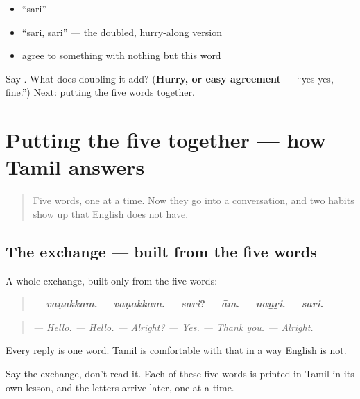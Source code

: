 \begin{itemize}
\raggedright
  \item \textquotedblleft{}sari\textquotedblright{}
  \item \textquotedblleft{}sari, sari\textquotedblright{} — the doubled, hurry-along version
  \item agree to something with nothing but this word
\end{itemize}

\begin{tcolorbox}[breakable,colback=teal!4,colframe=teal!35!black,title={Before you move on}]
Say \textbf{}. What does doubling it add? (\textbf{Hurry, or easy agreement} — \textquotedblleft{}yes yes, fine.\textquotedblright{}) Next: putting the five words together.
\end{tcolorbox}
\section[\texorpdfstring{\ta{ஆம்} / \ta{இல்லை} / \ta{சரி} (ām / illai / sari)}{ஆம் / இல்லை / சரி (ām / illai / sari)}]{Putting the five together — how Tamil answers}

\label{lesson:TA-C01-answering}



\begin{quote}
Five words, one at a time. Now they go into a conversation, and two habits show up that English does not have.
\end{quote}

\subsection*{The exchange — built from the five words}
A whole exchange, built only from the five words:

\begin{quote}
— \textbf{\emph{vaṇakkam}.} — \textbf{\emph{vaṇakkam}.} — \textbf{\emph{sari}?} — \textbf{\emph{ām}.} — \textbf{\emph{naṉṟi}.} — \textbf{\emph{sari}.}
\end{quote}

\begin{quote}
\emph{— Hello. — Hello.} \emph{— Alright? — Yes.} \emph{— Thank you. — Alright.}
\end{quote}

Every reply is one word. Tamil is comfortable with that in a way English is not.

Say the exchange, don't read it. Each of these five words is printed in Tamil in its own lesson, and the letters arrive later, one at a time.

